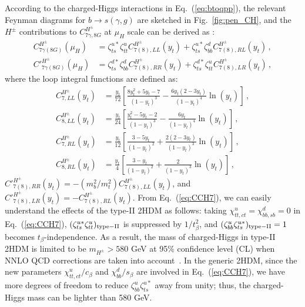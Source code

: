 \documentclass[prd,preprint,superscriptaddress,amsmath,amssymb]{revtex4}
\begin{document}
According to the charged-Higgs  interactions in Eq.~(\ref{eq:btoqpp}), the relevant Feynman diagrams for $b\to s (\gamma, g)$ are sketched in Fig.~\ref{fig:pen_CH}, and the $H^\pm$ contributions to $C^{H^\pm}_{7\gamma,8G}$ at $\mu_H$ scale can be derived  as : 
 \begin{align}
 C^{H^\pm}_{7\gamma(8G)} (\mu_H)& = \zeta^{u*}_{ts} \zeta^u_{tt}  C^{H^\pm}_{7(8),LL}(y_t) +  \zeta^{u*}_{ts} \zeta^d_{bb}  C^{H^\pm}_{7(8),RL}(y_t)  \,, \nonumber \\
 C'^{H^\pm}_{7\gamma(8G)} (\mu_H)& = \zeta^{d*}_{ts} \zeta^{d}_{bb} C^{H^\pm}_{7(8),RR} (y_t)+  \zeta^{d*}_{ts} \zeta^{u}_{tt} C^{H^\pm}_{7(8),LR}(y_t)\,, 
\label{eq:CCH7}
 \end{align}
 where the loop integral functions are defined as:
%
\begin{subequations}
 \begin{align}
 C^{H^\pm}_{7,LL} (y_t)& = \frac{y_t}{72} \left[ \frac{8 y^2_t + 5 y_t -7}{(1-y_t)^3} - \frac{6 y_t (2-3y_t)}{(1-y_t)^4} \ln(y_t)\right]\,,  \\
 C^{H^\pm}_{8,LL} (y_t)& = \frac{y_t}{24} \left[ \frac{ y^2_t - 5 y_t -2}{(1-y_t)^3} - \frac{6 y_t }{(1-y_t)^4} \ln(y_t)\right]\,,  \\
 C^{H^\pm}_{7,RL} (y_t)& = \frac{y_t}{12}  \left[ \frac{3-5y_t}{(1-y_t)^2} + \frac{2(2-3y_t)}{(1-y_t)^3 }\ln(y_t)  \right]\,,  \\
 C^{H^\pm}_{8,RL} (y_t)& = \frac{y_t}{4}  \left[ \frac{3-y_t}{(1-y_t)^2} + \frac{2}{(1-y_t)^3 } \ln(y_t)\right]\,,
 \end{align}
 \end{subequations}
 $C'^{H^\pm}_{7(8),RR} (y_t)= -(m^2_b/m^2_t ) C^{H^\pm}_{7(8),LL}(y_t)$, and  $C'^{H^\pm}_{7(8),LR} (y_t)= - C^{H^\pm}_{7(8),RL}(y_t)$. From Eq.~(\ref{eq:CCH7}), we can easily understand  the effects of the type-II 2HDM as follows: taking $\chi^u_{tt,ct}=\chi^d_{bb,sb}=0$ in Eq.~(\ref{eq:CCH7}),  $(\zeta^{u*}_{ts} \zeta^u_{tt} )_{\rm type-II}$  is suppressed by $1/t^2_\beta$, and  $(\zeta^u_{bb} \zeta^{u*}_{ts})_{\rm type-II}=1$ becomes  $t_\beta$-independence. As a result,  the mass of charged-Higgs  in type-II 2HDM is limited to be $m_{H^\pm} > 580$ GeV at 95\% confidence level (CL) when  NNLO QCD corrections are taken into account~\cite{Misiak:2017bgg}. In the generic 2HDM,  since the new parameters $\chi^u_{tt,ct}/c_\beta$ and $\chi^d_{bb}/s_\beta$ are involved in Eq.~(\ref{eq:CCH7}), we have more degrees of freedom to reduce $\zeta^u_{bb} \zeta^{u*}_{ts}$ away from unity; thus, the charged-Higgs mass can be lighter than 580 GeV. 
 
\end{document}
